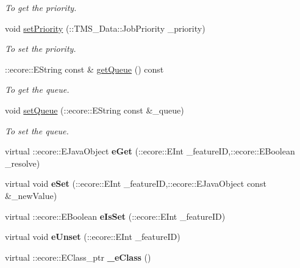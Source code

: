 \begin{DoxyCompactItemize}
\begin{DoxyCompactList}\small\item\em To get the priority. \item\end{DoxyCompactList}\item 
void \hyperlink{classTMS__Data_1_1ListJobsOptions_a62e7f748ecf6f1b767b3800dbd350c6e}{setPriority} (::TMS\_\-Data::JobPriority \_\-priority)
\begin{DoxyCompactList}\small\item\em To set the priority. \item\end{DoxyCompactList}\item 
::ecore::EString const \& \hyperlink{classTMS__Data_1_1ListJobsOptions_adc6416dea8e284291e6c7db978e9cba1}{getQueue} () const 
\begin{DoxyCompactList}\small\item\em To get the queue. \item\end{DoxyCompactList}\item 
void \hyperlink{classTMS__Data_1_1ListJobsOptions_a5b22c559b193748561f145b09af7d93a}{setQueue} (::ecore::EString const \&\_\-queue)
\begin{DoxyCompactList}\small\item\em To set the queue. \item\end{DoxyCompactList}\item 
\hypertarget{classTMS__Data_1_1ListJobsOptions_ae1d4f3bfcff87ce2b8c240c07aab3eb6}{
virtual ::ecore::EJavaObject {\bfseries eGet} (::ecore::EInt \_\-featureID,::ecore::EBoolean \_\-resolve)}
\label{classTMS__Data_1_1ListJobsOptions_ae1d4f3bfcff87ce2b8c240c07aab3eb6}

\item 
\hypertarget{classTMS__Data_1_1ListJobsOptions_a99f4bdf46fb00009ad096ae3547d5f9c}{
virtual void {\bfseries eSet} (::ecore::EInt \_\-featureID,::ecore::EJavaObject const \&\_\-newValue)}
\label{classTMS__Data_1_1ListJobsOptions_a99f4bdf46fb00009ad096ae3547d5f9c}

\item 
\hypertarget{classTMS__Data_1_1ListJobsOptions_a0db5102e3c91c2520290f3cf7f6ae3c7}{
virtual ::ecore::EBoolean {\bfseries eIsSet} (::ecore::EInt \_\-featureID)}
\label{classTMS__Data_1_1ListJobsOptions_a0db5102e3c91c2520290f3cf7f6ae3c7}

\item 
\hypertarget{classTMS__Data_1_1ListJobsOptions_a5682f50cfe87edfe865298637acae4f6}{
virtual void {\bfseries eUnset} (::ecore::EInt \_\-featureID)}
\label{classTMS__Data_1_1ListJobsOptions_a5682f50cfe87edfe865298637acae4f6}

\item 
\hypertarget{classTMS__Data_1_1ListJobsOptions_a0cb1a05fd5d182c4c6612346f7f11c0e}{
virtual ::ecore::EClass\_\-ptr {\bfseries \_\-eClass} ()}
\label{classTMS__Data_1_1ListJobsOptions_a0cb1a05fd5d182c4c6612346f7f11c0e}

\end{DoxyCompactItemize}
